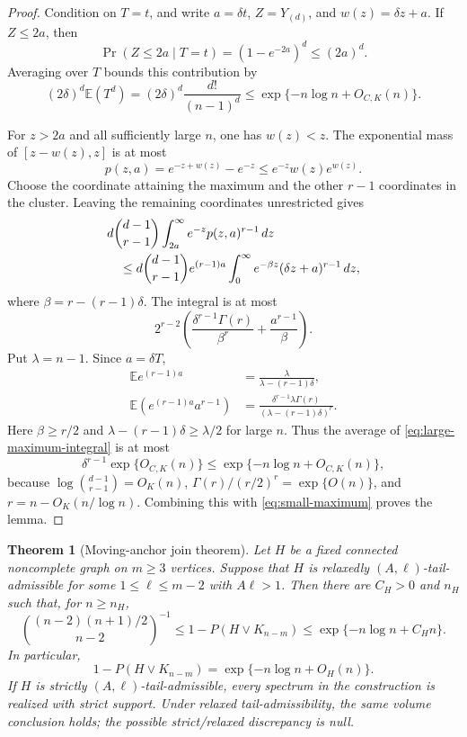 \documentclass[11pt,reqno]{amsart}
\newtheorem{theorem}{Theorem}[section]
\theoremstyle{definition}
\theoremstyle{remark}
\begin{document}
\begin{proof}
Condition on $T=t$, and write $a=\delta t$, $Z=Y_{(d)}$, and
$w(z)=\delta z+a$.  If $Z\le2a$, then
\[
  \Pr(Z\le2a\mid T=t)=(1-e^{-2a})^d\le(2a)^d.
\]
Averaging over $T$ bounds this contribution by
\begin{equation}\label{eq:small-maximum}
  (2\delta)^d\mathbb E(T^d)
  =(2\delta)^d\frac{d!}{(n-1)^d}
  \le\exp\{-n\log n+O_{C,K}(n)\}.
\end{equation}

For $z>2a$ and all sufficiently large $n$, one has $w(z)<z$.  The
exponential mass of $[z-w(z),z]$ is at most
\[
  p(z,a)=e^{-z+w(z)}-e^{-z}
  \le e^{-z}w(z)e^{w(z)}.
\]
Choose the coordinate attaining the maximum and the other $r-1$ coordinates
in the cluster.  Leaving the remaining coordinates unrestricted gives
\begin{align}
 &d\binom{d-1}{r-1}
   \int_{2a}^{\infty}e^{-z}p(z,a)^{r-1}\,dz \notag\\
 &\quad\le d\binom{d-1}{r-1}e^{(r-1)a}
 \int_0^\infty e^{-\beta z}(\delta z+a)^{r-1}\,dz,
 \label{eq:large-maximum-integral}
\end{align}
where $\beta=r-(r-1)\delta$.  The integral is at most
\begin{equation}\label{eq:cluster-gamma}
  2^{r-2}\left(
    \frac{\delta^{r-1}\Gamma(r)}{\beta^r}
    +\frac{a^{r-1}}\beta\right).
\end{equation}
Put $\lambda=n-1$.  Since $a=\delta T$,
\begin{align*}
  \mathbb E e^{(r-1)a}
    &=\frac\lambda{\lambda-(r-1)\delta},\\
  \mathbb E\!\left(e^{(r-1)a}a^{r-1}\right)
    &=\frac{\delta^{r-1}\lambda\Gamma(r)}
      {(\lambda-(r-1)\delta)^r}.
\end{align*}
Here $\beta\ge r/2$ and
$\lambda-(r-1)\delta\ge\lambda/2$ for large $n$.  Thus the average of
\eqref{eq:large-maximum-integral} is at most
\[
  \delta^{r-1}\exp\{O_{C,K}(n)\}
  \le\exp\{-n\log n+O_{C,K}(n)\},
\]
because $\log\binom{d-1}{r-1}=O_K(n)$,
$\Gamma(r)/(r/2)^r=\exp\{O(n)\}$, and
$r=n-O_K(n/\log n)$.  Combining this with
\eqref{eq:small-maximum} proves the lemma.
\end{proof}

\begin{theorem}[Moving-anchor join theorem]\label{thm:moving-anchor}
Let $H$ be a fixed connected noncomplete graph on $m\ge3$ vertices.  Suppose
that $H$ is relaxedly $(A,\ell)$-tail-admissible for some
$1\le\ell\le m-2$ with $A\ell>1$.  Then there are $C_H>0$ and $n_H$ such
that, for $n\ge n_H$,
\begin{equation}\label{eq:moving-anchor-two-sided}
  \binom{(n-2)(n+1)/2}{n-2}^{-1}
  \le1-P(H\vee K_{n-m})
  \le\exp\{-n\log n+C_Hn\}.
\end{equation}
In particular,
\begin{equation}\label{eq:tail-law}
  1-P(H\vee K_{n-m})=\exp\{-n\log n+O_H(n)\}.
\end{equation}
If $H$ is strictly $(A,\ell)$-tail-admissible, every spectrum in the construction is
realized with strict support.  Under relaxed tail-admissibility, the same
volume conclusion holds; the possible strict/relaxed discrepancy is null.
\end{theorem}
\end{document}
